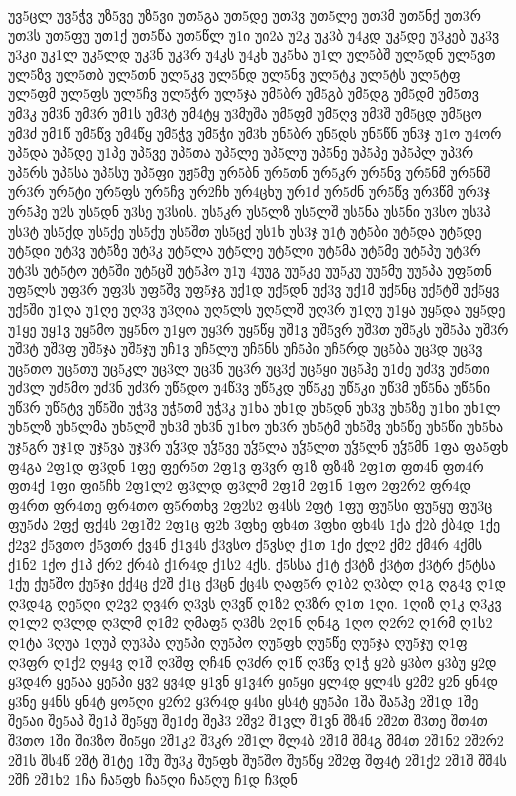 {უვ5ცლ
უვ5ჭვ
უზ5ვე
უზ5ვი
უთ5გა
უთ5დე
უთ3ვ
უთ5ლე
უთ3მ
უთ5ნქ
უთ3რ
უთ3ს
უთ5ფუ
უთ1ქ
უთ5წა
უთ5წლ
უ1ი
უი2ა
უ2კ
უკ3ბ
უ4კდ
უკ5დე
უ3კებ
უკ3ვ
უ3კი
უკ1ლ
უკ5ლდ
უკ3ნ
უკ3რ
უ4კს
უ4კხ
უკ5ხა
უ1ლ
ულ5ბშ
ულ5დნ
ულ5ვთ
ულ5ზვ
ულ5თბ
ულ5თნ
ულ5კვ
ულ5ნდ
ულ5ნვ
ულ5ტკ
ულ5ტს
ულ5ტფ
ულ5ფმ
ულ5ფს
ულ5ჩვ
ულ5ჭრ
ულ5ჯა
უმ5ბრ
უმ5გბ
უმ5დგ
უმ5დმ
უმ5თვ
უმ3კ
უმ3ნ
უმ3რ
უმ1ს
უმ3ტ
უმ4ტყ
უ3მუშა
უმ5ფმ
უმ5ღვ
უმ3შ
უმ5ცდ
უმ5ცო
უმ3ძ
უმ1წ
უმ5წვ
უმ4წყ
უმ5ჭვ
უმ5ჭი
უმ3ხ
უნ5ბრ
უნ5დს
უნ5წნ
უნ3ჯ
უ1ო
უ4ორ
უპ5და
უპ5დე
უ1პე
უპ5ვე
უპ5თა
უპ5ლე
უპ5ლუ
უპ5ნე
უპ5პე
უპ5პლ
უპ3რ
უპ5რს
უპ5სა
უპ5სუ
უპ5ფი
უჟ5მუ
ურ5ბნ
ურ5თნ
ურ5კრ
ურ5ნვ
ურ5ნმ
ურ5ნშ
ურ3რ
ურ5ტი
ურ5ფს
ურ5ჩვ
ურ2ჩხ
ურ4ცხუ
ურ1ძ
ურ5ძნ
ურ5წვ
ურ3წმ
ურ3ჯ
ურ5ჰე
უ2ს
უს5დნ
უ3სე
უ3სის.
უს5კრ
უს5ლზ
უს5ლშ
უს5ნა
უს5ნი
უ3სო
უს3პ
უს3ტ
უს5ქდ
უს5ქე
უს5ქუ
უს5შთ
უს5ცქ
უს1ხ
უს3ჯ
უ1ტ
უტ5ბი
უტ5და
უტ5დე
უტ5დი
უტ3ვ
უტ5ზე
უტ3კ
უტ5ლა
უტ5ლე
უტ5ლი
უტ5მა
უტ5მე
უტ5პუ
უტ3რ
უტ3ს
უტ5ტო
უტ5ში
უტ5ცშ
უტ5ჰო
უ1უ
4უუგ
უუ5კე
უუ5კუ
უუ5მუ
უუ5პა
უფ5თნ
უფ5ლს
უფ3რ
უფ3ს
უფ5შვ
უფ5ჯგ
უქ1დ
უქ5დნ
უქ3ვ
უქ1მ
უქ5ნც
უქ5ტშ
უქ5ყვ
უქ5ში
უ1ღა
უ1ღე
უღ3ვ
უ3ღია
უღ5ლს
უღ5ლშ
უღ3რ
უ1ღუ
უ1ყა
უყ5და
უყ5დე
უ1ყე
უყ1ვ
უყ5მო
უყ5ნო
უ1ყო
უყ3რ
უყ5წყ
უშ1ვ
უშ5ვრ
უშ3თ
უშ5კს
უშ5პა
უშ3რ
უშ3ტ
უშ3ფ
უშ5ჯა
უშ5ჯუ
უჩ1ვ
უჩ5ლუ
უჩ5ნს
უჩ5პი
უჩ5რდ
უც5ბა
უც3დ
უც3ვ
უც5თო
უც5თუ
უც5კლ
უც3ლ
უც3ნ
უც3რ
უც3ქ
უც5ყი
უც5ჰე
უ1ძე
უძ3ვ
უძ5თი
უძ3ლ
უძ5მო
უძ3ნ
უძ3რ
უწ5დო
უ4წ3ვ
უწ5კდ
უწ5კე
უწ5კი
უწ3მ
უწ5ნა
უწ5ნი
უწ3რ
უწ5ტვ
უწ5ში
უჭ3ვ
უჭ5თმ
უჭ3კ
უ1ხა
უხ1დ
უხ5დნ
უხ3ვ
უხ5ზე
უ1ხი
უხ1ლ
უხ5ლზ
უხ5ლმა
უხ5ლშ
უხ3მ
უხ3ნ
უ1ხო
უხ3რ
უხ5ტმ
უხ5შვ
უხ5წე
უხ5წი
უხ5ხა
უჯ5გრ
უჯ1დ
უჯ5ვა
უჯ3რ
უჴ3დ
უჴ5ვე
უჴ5ლა
უჴ5ლთ
უჴ5ლნ
უჴ5მნ
1ფა
ფა5ფხ
ფ4გა
2ფ1დ
ფ3დნ
1ფე
ფერ5თ
2ფ1ვ
ფ3ვრ
ფ1ზ
ფზ4ზ
2ფ1თ
ფთ4ნ
ფთ4რ
ფთ4ქ
1ფი
ფი5ჩხ
2ფ1ლ2
ფ3ლდ
ფ3ლმ
2ფ1მ
2ფ1ნ
1ფო
2ფ2რ2
ფრ4დ
ფ4რთ
ფრ4თე
ფრ4თო
ფ5რთხვ
2ფ2ს2
ფ4სს
2ფტ
1ფუ
ფუ5სი
ფუ5ყუ
ფუ3ც
ფუ5ძა
2ფქ
ფქ4ს
2ფ1შ2
2ფ1ც
ფ2ხ
3ფხე
ფხ4თ
3ფხი
ფხ4ს
1ქა
ქ2ბ
ქბ4დ
1ქე
ქ2ვ2
ქ5ვთო
ქ5ვთრ
ქვ4ნ
ქ1ვ4ს
ქ3ვსო
ქ5ვსღ
ქ1თ
1ქი
ქლ2
ქმ2
ქმ4რ
4ქმს
ქ1ნ2
1ქო
ქ1პ
ქრ2
ქრ4ბ
ქ1რ4დ
ქ1ს2
4ქს.
ქ5სსა
ქ1ტ
ქ3ტზ
ქ3ტთ
ქ3ტრ
ქ5ტსა
1ქუ
ქუ5შო
ქუ5ჯი
ქქ4ც
ქ2შ
ქ1ც
ქ3ცნ
ქც4ს
ღაფ5რ
ღ1ბ2
ღ3ბლ
ღ1გ
ღგ4ვ
ღ1დ
ღ3დ4გ
ღე5ღი
ღ2ვ2
ღვ4რ
ღ3ვს
ღ3ვწ
ღ1ზ2
ღ3ზრ
ღ1თ
1ღი.
1ღიზ
ღ1კ
ღ3კვ
ღ1ლ2
ღ3ლდ
ღ3ლმ
ღ1მ2
ღმაფ5
ღ3მს
2ღ1ნ
ღნ4გ
1ღო
ღ2რ2
ღ1რმ
ღ1ს2
ღ1ტა
3ღუა
1ღუპ
ღუ3პა
ღუ5პი
ღუ5პო
ღუ5ფხ
ღუ5წე
ღუ5ჯა
ღუ5ჯუ
ღ1ფ
ღ3ფრ
ღ1ქ2
ღყ4ვ
ღ1შ
ღ3შფ
ღჩ4ნ
ღ3ძრ
ღ1წ
ღ3წვ
ღ1ჭ
ყ2ბ
ყ3ბო
ყ3ბუ
ყ2დ
ყ3დ4რ
ყე5აა
ყე5პი
ყვ2
ყვ4დ
ყ1ვნ
ყ1ვ4რ
ყი5ყი
ყლ4დ
ყლ4ს
ყ2მ2
ყ2ნ
ყნ4დ
ყ3ნე
ყ4ნს
ყნ4ტ
ყო5ღი
ყ2რ2
ყ3რ4დ
ყ4სი
ყს4ტ
ყუ5პი
1შა
შა5ჰე
2შ1დ
1შე
შე5აი
შე5აპ
შე1პ
შე5ყუ
შე1ძე
შეჰ3
2შვ2
შ1ვლ
შ1ვნ
შზ4ნ
2შ2თ
შ3თე
შთ4თ
შ3თო
1ში
ში3ზო
ში5ყი
2შ1კ2
შ3კრ
2შ1ლ
შლ4ბ
2შ1მ
შმ4გ
შმ4თ
2შ1ნ2
2შ2რ2
2შ1ს
შს4წ
2შტ
შ1ტე
1შუ
შუ3კ
შუ5ფხ
შუ5შო
შუ5წყ
2შ2ფ
შფ4ტ
2შ1ქ2
2შ1შ
შშ4ს
2შჩ
2შ1ხ2
1ჩა
ჩა5ფხ
ჩა5ღი
ჩა5ღუ
ჩ1დ
ჩ3დნ
}
